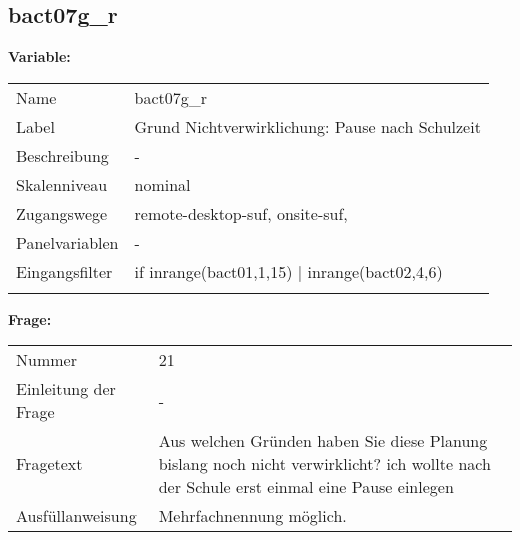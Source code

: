 	
	
	\subsection{bact07g\_r}
	\label{subSection:bact07g_r}

	\noindent\textbf{Variable:}\\
		\begin{tabular}{lL{11.3cm}}
			\label{tableVariable:bact07g_r}
			Name & bact07g\_r \\
			Label & Grund Nichtverwirklichung: Pause nach Schulzeit \\
			Beschreibung & - \\
			Skalenniveau & nominal \\
			Zugangswege &
				remote-desktop-suf,
				onsite-suf,
 \\
			Panelvariablen & -
			 \\
			Eingangsfilter & if inrange(bact01,1,15) | inrange(bact02,4,6) \\
 \\
		\end{tabular}

		\vspace*{1 cm}
		\noindent\textbf{Frage:}\\
		\begin{tabular}{lL{11.3cm}}
			\label{tableQuestion:bact07g_r}
			Nummer & 21 \\
			Einleitung der Frage & - \\
			Fragetext & Aus welchen Gründen haben Sie diese Planung bislang noch nicht verwirklicht?
ich wollte nach der Schule erst einmal eine Pause einlegen \\
			Ausfüllanweisung & Mehrfachnennung möglich. \\
		\end{tabular}





